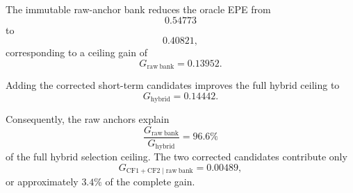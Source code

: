 \documentclass[11pt,a4paper]{article}
\begin{document}
\begin{table}[t]
    \centering
    \caption{Post-hoc temporal-memory oracle audit on dataset 7.
    The oracle selects the candidate with the smallest disparity error independently at
    each valid pixel. These results measure information availability and do not represent
    the performance of a deployable model.}
    \label{tab:hybrid_memory_oracle}
\end{table}

The immutable raw-anchor bank reduces the oracle EPE from
\begin{equation}
    0.54773
\end{equation}
to
\begin{equation}
    0.40821,
\end{equation}
corresponding to a ceiling gain of
\begin{equation}
    G_{\mathrm{raw\ bank}}
    =
    0.13952.
\end{equation}

Adding the corrected short-term candidates improves the full hybrid ceiling to
\begin{equation}
    G_{\mathrm{hybrid}}
    =
    0.14442.
\end{equation}

Consequently, the raw anchors explain
\begin{equation}
    \frac{
        G_{\mathrm{raw\ bank}}
    }{
        G_{\mathrm{hybrid}}
    }
    =
    96.6\%
\end{equation}
of the full hybrid selection ceiling. The two corrected candidates contribute only
\begin{equation}
    G_{\mathrm{CF1+CF2}\mid\mathrm{raw\ bank}}
    =
    0.00489,
\end{equation}
or approximately \(3.4\%\) of the complete gain.
\end{document}
